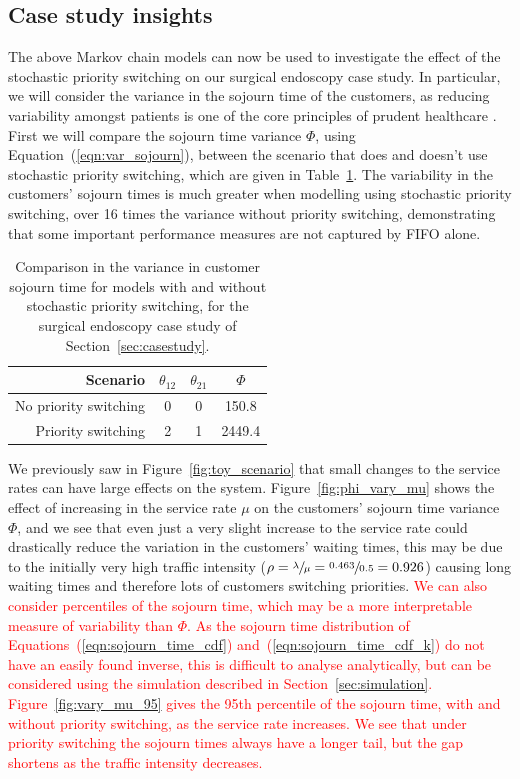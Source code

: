\documentclass{article}
\begin{document}
\subsection{Case study insights}
The above Markov chain models can now be used to investigate the effect of the
stochastic priority switching on our surgical endoscopy case study.
In particular, we will consider the variance in the sojourn time of the
customers, as reducing variability amongst patients is one of the core
principles of prudent healthcare \cite{prudent15}.
First we will compare the sojourn time variance $\Phi$, using
Equation~(\ref{eqn:var_sojourn}), between the scenario that does and doesn't use
stochastic priority switching, which are given in
Table~\ref{tbl:phi_with_without}.
The variability in the customers' sojourn times is much greater when modelling
using stochastic priority switching, over 16 times the variance without priority
switching, demonstrating that some important performance measures are not
captured by FIFO alone.

\begin{table}
\begin{center}
\begin{tabular}{rccc}
\toprule
Scenario & $\theta_{12}$ & $\theta_{21}$ & $\Phi$ \\
\midrule
No priority switching & 0 & 0 & 150.8 \\
Priority switching & 2 & 1 & 2449.4 \\
\bottomrule
\end{tabular}
\end{center}
\caption{Comparison in the variance in customer sojourn time for models with and
without stochastic priority switching, for the surgical endoscopy case study of
Section~\ref{sec:casestudy}.}
\label{tbl:phi_with_without}
\end{table}

We previously saw in Figure~\ref{fig:toy_scenario} that small changes to the
service rates can have large effects on the system.
Figure~\ref{fig:phi_vary_mu} shows the effect of increasing in the service rate
$\mu$ on the customers' sojourn time variance $\Phi$, and we see that even just
a very slight increase to the service rate could drastically reduce the
variation in the customers' waiting times, this may be due to the initially very
high traffic intensity
($\rho = \sfrac{\lambda}{\mu} = \sfrac{0.463}{0.5} = 0.926$) causing long
waiting times and therefore lots of customers switching priorities.
\textcolor{red}{We can also consider percentiles of the sojourn time, which may
be a more interpretable measure of variability than $\Phi$.
As the sojourn time distribution of Equations~(\ref{eqn:sojourn_time_cdf})
and~(\ref{eqn:sojourn_time_cdf_k}) do not have an easily found inverse, this is
difficult to analyse analytically, but can be considered using the simulation
described in Section~\ref{sec:simulation}.
Figure~\ref{fig:vary_mu_95} gives the 95th percentile of the sojourn time, with
and without priority switching, as the service rate increases.
We see that under priority switching the sojourn times always have a longer
tail, but the gap shortens as the traffic intensity decreases.}
\end{document}
